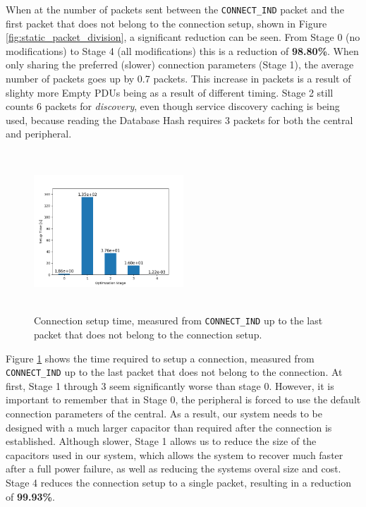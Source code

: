When at the number of packets sent between the \texttt{CONNECT\_IND} packet and the first packet that does not belong to the connection setup, shown in Figure \ref{fig:static_packet_division}, a significant reduction can be seen. From Stage 0 (no modifications) to Stage 4 (all modifications) this is a reduction of \textbf{98.80\%}. When only sharing the preferred (slower) connection parameters (Stage 1), the average number of packets goes up by 0.7 packets. This increase in packets is a result of slighty more Empty PDUs being as a result of different timing. Stage 2 still counts 6 packets for \textit{discovery}, even though service discovery caching is being used, because reading the Database Hash requires 3 packets for both the central and peripheral. 

\begin{figure}[]
    \centering
    \includegraphics[width=0.5\textwidth,height=6cm,keepaspectratio=true]{plots/static_setup_time.png}
    \caption{
        Connection setup time, measured from \texttt{CONNECT\_IND} up to the last packet that does not belong to the connection setup.
    }
    \label{fig:static_setup_time}
\end{figure}

Figure \ref{fig:static_setup_time} shows the time required to setup a connection, measured from \texttt{CONNECT\_IND} up to the last packet that does not belong to the connection. At first, Stage 1 through 3 seem significantly worse than stage 0. However, it is important to remember that in Stage 0, the peripheral is forced to use the default connection parameters of the central. As a result, our system needs to be designed with a much larger capacitor than required after the connection is established. Although slower, Stage 1 allows us to reduce the size of the capacitors used in our system, which allows the system to recover much faster after a full power failure, as well as reducing the systems overal size and cost. Stage 4 reduces the connection setup to a single packet, resulting in a reduction of \textbf{99.93\%}.

